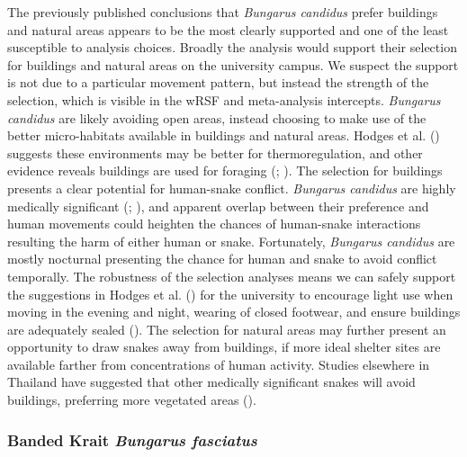 \documentclass[10pt,a4paper]{article}
\begin{document}
The previously published conclusions that \emph{Bungarus candidus} prefer buildings and natural areas appears to be the most clearly supported and one of the least susceptible to analysis choices.
Broadly the analysis would support their selection for buildings and natural areas on the university campus.
We suspect the support is not due to a particular movement pattern, but instead the strength of the selection, which is visible in the wRSF and meta-analysis intercepts.
\emph{Bungarus candidus} are likely avoiding open areas, instead choosing to make use of the better micro-habitats available in buildings and natural areas.
Hodges et al. () suggests these environments may be better for thermoregulation, and other evidence reveals buildings are used for foraging (; ).
The selection for buildings presents a clear potential for human-snake conflict.
\emph{Bungarus candidus} are highly medically significant (; ), and apparent overlap between their preference and human movements could heighten the chances of human-snake interactions resulting the harm of either human or snake.
Fortunately, \emph{Bungarus candidus} are mostly nocturnal presenting the chance for human and snake to avoid conflict temporally.
The robustness of the selection analyses means we can safely support the suggestions in Hodges et al. () for the university to encourage light use when moving in the evening and night, wearing of closed footwear, and ensure buildings are adequately sealed ().
The selection for natural areas may further present an opportunity to draw snakes away from buildings, if more ideal shelter sites are available farther from concentrations of human activity.
Studies elsewhere in Thailand have suggested that other medically significant snakes will avoid buildings, preferring more vegetated areas ().

\subsubsection{\texorpdfstring{Banded Krait \emph{Bungarus fasciatus}}{Banded Krait Bungarus fasciatus}}\label{banded-krait-bungarus-fasciatus}
\end{document}
